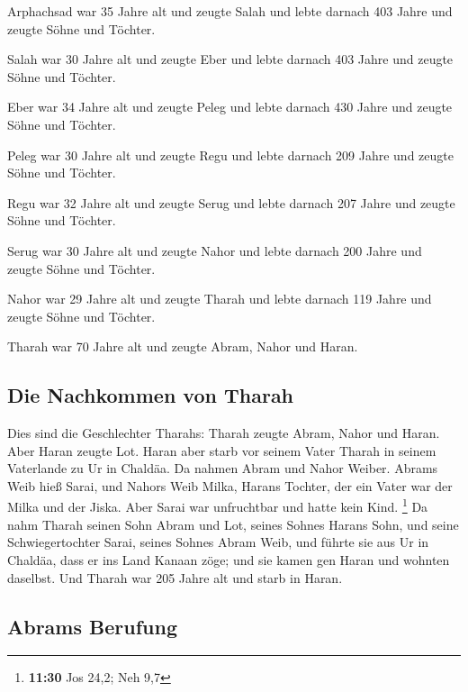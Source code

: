  Arphachsad war 35 Jahre alt und zeugte Salah
 und lebte darnach 403 Jahre und zeugte Söhne und
Töchter.

 Salah war 30 Jahre alt und zeugte Eber 
und lebte darnach 403 Jahre und zeugte Söhne und Töchter.

 Eber war 34 Jahre alt und zeugte Peleg 
und lebte darnach 430 Jahre und zeugte Söhne und Töchter.

 Peleg war 30 Jahre alt und zeugte Regu 
und lebte darnach 209 Jahre und zeugte Söhne und Töchter.

 Regu war 32 Jahre alt und zeugte Serug 
und lebte darnach 207 Jahre und zeugte Söhne und Töchter.

 Serug war 30 Jahre alt und zeugte Nahor 
und lebte darnach 200 Jahre und zeugte Söhne und Töchter.

 Nahor war 29 Jahre alt und zeugte Tharah 
und lebte darnach 119 Jahre und zeugte Söhne und Töchter.

 Tharah war 70 Jahre alt und zeugte Abram, Nahor und
Haran.

\hypertarget{die-nachkommen-von-tharah}{%
\subsection{Die Nachkommen von Tharah}\label{die-nachkommen-von-tharah}}

 Dies sind die Geschlechter Tharahs: Tharah zeugte Abram,
Nahor und Haran. Aber Haran zeugte Lot.  Haran aber starb
vor seinem Vater Tharah in seinem Vaterlande zu Ur in Chaldäa.
 Da nahmen Abram und Nahor Weiber. Abrams Weib hieß
Sarai, und Nahors Weib Milka, Harans Tochter, der ein Vater war der
Milka und der Jiska.  Aber Sarai war unfruchtbar und
hatte kein Kind. \footnote{\textbf{11:30} Jos 24,2; Neh 9,7}
 Da nahm Tharah seinen Sohn Abram und Lot, seines Sohnes
Harans Sohn, und seine Schwiegertochter Sarai, seines Sohnes Abram Weib,
und führte sie aus Ur in Chaldäa, dass er ins Land Kanaan zöge; und sie
kamen gen Haran und wohnten daselbst.  Und Tharah war 205
Jahre alt und starb in Haran.

\hypertarget{abrams-berufung}{%
\subsection{Abrams Berufung}\label{abrams-berufung}}

